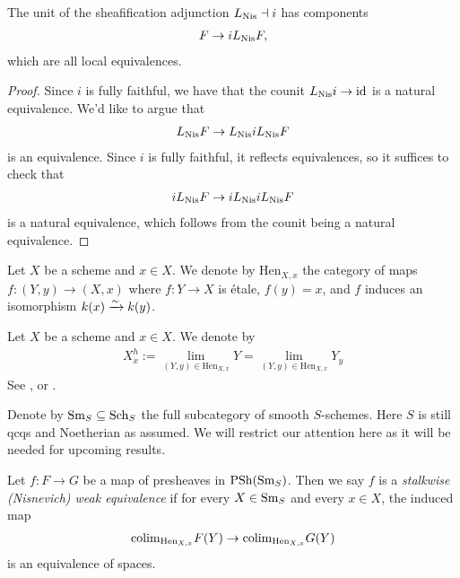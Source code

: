 \documentclass[11pt,openany]{book}
\renewcommand{\Pre}{\mathrm{PSh}}
\providecommand{\Hen}{\mathrm{Hen}}
\begin{document}
\begin{example}\label{exa:sheafification-local-equivalence}
The unit of the sheafification adjunction $L_{\mathrm{Nis}} \dashv i$ has components
\begin{align*}
    F \to i L_{\mathrm{Nis}} F,
\end{align*}
which are all local equivalences.
\end{example}
\begin{proof} Since $i$ is fully faithful, we have that the counit $L_{\mathrm{Nis}} i \to \mathrm{id}$ is a natural equivalence. We'd like to argue that
\begin{align*}
    L_{\mathrm{Nis}} F \to L_{\mathrm{Nis}} i L_{\mathrm{Nis}} F
\end{align*}
is an equivalence. Since $i$ is fully faithful, it reflects equivalences, so it suffices to check that
\begin{align*}
    i L_{\mathrm{Nis}} F \to i L_{\mathrm{Nis}} i L_{\mathrm{Nis}} F
\end{align*}
is a natural equivalence, which follows from the counit being a natural equivalence.
\end{proof}



\begin{notation} Let $X$ be a scheme and $x\in X$. We denote by $\Hen_{X,x}$ the category of maps $f \colon (Y,y) \to (X,x)$ where $f \colon Y \to X$ is \'etale, $f(y) = x$, and $f$ induces an isomorphism $k(x) \xrightarrow{\sim} k(y)$.
\end{notation}


\begin{definition} Let $X$ be a scheme and $x\in X$. We denote by 
\begin{align*}
    X_x^h := \lim_{(Y,y) \in \Hen_{X,x}} Y = \lim_{(Y,y) \in \Hen_{X,x}} Y_y
\end{align*}
See \cite[04GV]{Stacks}, or \cite[2.22]{Bachmann-K}.
\end{definition}

\begin{notation} Denote by $\mathrm{Sm}_S \subseteq \mathrm{Sch}_S$ the full subcategory of smooth $S$-schemes. Here $S$ is still qcqs and Noetherian as assumed. We will restrict our attention here as it will be needed for upcoming results.
\end{notation}

\begin{definition} Let $f \colon F \to G$ be a map of presheaves in $\Pre(\Sm_S)$. Then we say $f$ is a \textit{stalkwise (Nisnevich) weak equivalence} if for every $X\in \mathrm{Sm}_S$ and every $x\in X$, the induced map
\begin{align*}
    \colim_{\Hen_{X,x}} F(Y) \to \colim_{\Hen_{X,x}} G(Y)
\end{align*}
is an equivalence of spaces.
\end{definition}
\end{document}
